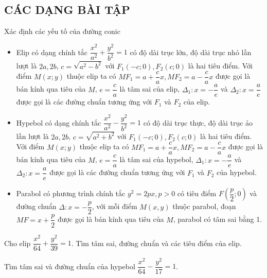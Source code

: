 \subsection{CÁC DẠNG BÀI TẬP} 
\begin{dang}{Xác định các yếu tố của đường conic} 
	\begin{itemize}
		\item Elip có dạng chính tắc $\dfrac{x^2}{a^2}+\dfrac{y^2}{b^2}=1$ có độ dài trục lớn, độ dài trục nhỏ lần lượt là $2a, 2b$,  $c=\sqrt{a^2-b^2}$ với $F_1(-c;0), F_2(c;0) $ là hai tiêu điểm. Với điểm $M(x;y)$ thuộc elip ta có $MF_1=a+\dfrac{c}{a}x, MF_2=a-\dfrac{c}{a} x$ được gọi là bán kính qua tiêu của $M$, $e=\dfrac{c}{a}$ là tâm sai của elip, $\Delta_1: x=-\dfrac{a}{e}$ và $\Delta_2: x=\dfrac{a}{e}$ được gọi là các đường chuẩn tương ứng với $F_1$ và $F_2$ của elip.
		\item 	Hypebol có dạng chính tắc $\dfrac{x^2}{a^2}-\dfrac{y^2}{b^2}=1$ có độ dài trục thực, độ dài trục ảo lần lượt là $2a, 2b$,  $c=\sqrt{a^2+b^2}$ với $F_1(-c;0), F_2(c;0) $ là hai tiêu điểm. Với điểm $M(x;y)$ thuộc elip ta có $MF_1=a+\dfrac{c}{a}x, MF_2=a-\dfrac{c}{a} x$ được gọi là bán kính qua tiêu của $M$, $e=\dfrac{c}{a}$ là tâm sai của hypebol, $\Delta_1: x=-\dfrac{a}{e}$ và $\Delta_2: x=\dfrac{a}{e}$ được gọi là các đường chuẩn tương ứng với $F_1$ và $F_2$ của hypebol. 
		\item Parabol có phương trình chính tắc $y^2=2px, p>0$ có tiêu điểm $F\left( \dfrac{p}{2};0  \right) $ và đường chuẩn $\Delta: x=-\dfrac{p}{2}$, với mỗi điểm $M(x,y)$ thuộc parabol, đoạn $MF= x+\dfrac{p}{2}$ được gọi là bán kính qua tiêu của $M$, parabol có tâm sai bằng 1.
	\end{itemize}
\end{dang} 
\begin{vd}
	Cho elip $\dfrac{x^2}{64}+\dfrac{y^2}{39} =1$. Tìm tâm sai, đường chuẩn và các tiêu điểm của elip.
\end{vd}
\begin{vd}
	Tìm tâm sai và đường chuẩn của hypebol $\dfrac{x^2}{64}-\dfrac{y^2}{17} =1$.
	
\end{vd}
